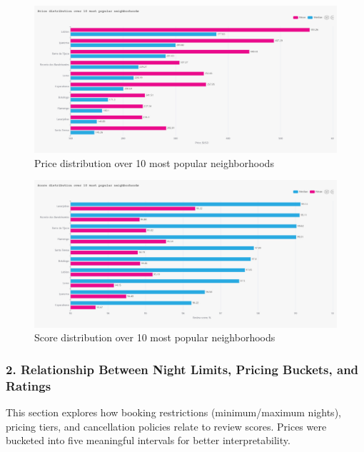 \vspace{1em}
\begin{figure}[H]
    \centering
    \includegraphics[width=1\textwidth]{images/q1_1.jpg}
    \caption{Price distribution over 10 most popular neighborhoods}
    \label{fig:figureq1}
\end{figure}

\vspace{1em}
\begin{figure}[H]
    \centering
    \includegraphics[width=1\textwidth]{images/q1_2.jpg}
    \caption{Score distribution over 10 most popular neighborhoods}
    \label{fig:figureq2}
\end{figure}

\subsubsection*{2. Relationship Between Night Limits, Pricing Buckets, and Ratings }

This section explores how booking restrictions (minimum/maximum nights), pricing tiers, and cancellation policies relate to review scores. Prices were bucketed into five meaningful intervals for better interpretability.

